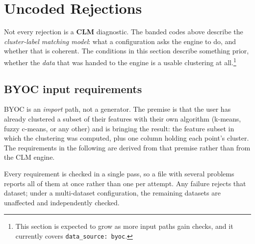 \documentclass[a4paper,11pt]{article}
\newcommand{\vcode}[1]{\textcolor{valred}{\bfseries\ttfamily #1}}
\begin{document}
\newpage

\section{Uncoded Rejections}

\noindent Not every rejection is a \vcode{CLM} diagnostic. The banded codes above describe the \emph{cluster-label matching model}: what a configuration asks the engine to do, and whether that is coherent. The conditions in this section describe something prior, whether the \emph{data} that was handed to the engine is a usable clustering at all.\footnote{This section is expected to grow as more input paths gain checks, and it currently covers \texttt{data\_source:~byoc}.}

\subsection{BYOC input requirements}

\noindent BYOC is an \emph{import} path, not a generator. The premise is that the user has already clustered a subset of their features with their own algorithm (k-means, fuzzy c-means, or any other) and is bringing the result: the feature subset in which the clustering was computed, plus one column holding each point's cluster. The requirements in the following are derived from that premise rather than from the CLM engine.

\vspace{0.4em}
\noindent Every requirement is checked in a single pass, so a file with several problems reports all of them at once rather than one per attempt. Any failure rejects that dataset; under a multi-dataset configuration, the remaining datasets are unaffected and independently checked.
\end{document}
